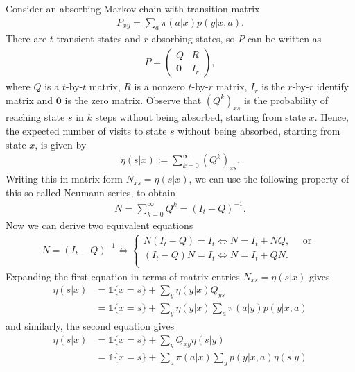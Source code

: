 \documentclass[a4paper]{article}
\begin{document}
Consider an absorbing Markov chain with transition matrix
\begin{align*}
  P_{xy} = \sum_{a} \pi(a | x) p(y | x, a) .
\end{align*}
There are $t$ transient states and $r$ absorbing states, so $P$ can be written
as
\begin{align*}
  P = \begin{pmatrix}
        Q & R \\
        \mathbf{0} & I_{r}
      \end{pmatrix} ,
\end{align*}
where $Q$ is a $t$-by-$t$ matrix, $R$ is a nonzero $t$-by-$r$ matrix, $I_{r}$ is
the $r$-by-$r$ identify matrix and $\mathbf{0}$ is the zero matrix.
%
Observe that $(Q^{k})_{xs}$ is the probability of reaching state $s$ in $k$
steps without being absorbed, starting from state $x$. Hence, the expected
number of visits to state $s$ without being absorbed, starting from state $x$,
is given by
\begin{align*}
  \eta(s | x) := \sum_{k=0}^{\infty} (Q^{k})_{xs} .
\end{align*}
%
Writing this in matrix form $N_{xs} = \eta(s | x)$, we can use the following
property of this so-called Neumann series, to obtain
\begin{align*}
  N = \sum_{k=0}^{\infty} Q^{k} = {(I_{t} - Q)}^{-1} .
\end{align*}
Now we can derive two equivalent equations
\begin{align*}
  N = (I_{t} - Q)^{-1} \iff
  \begin{cases}
    N (I_{t} - Q) = I_{t} \iff N = I_{t} + NQ ,
    \quad  \text{ or }  \\
    (I_{t} - Q) N = I_{t} \iff N = I_{t} + QN . \\
  \end{cases}
\end{align*}
%
Expanding the first equation in terms of matrix entries $N_{xs} = \eta(s | x)$
gives
\begin{align*}
  \eta(s | x) &= \mathds{1}\{ x = s \} + \sum_{y}  \eta(y | x) Q_{ys} \\
  &= \mathds{1}\{ x = s \} +  \sum_{y}\eta(y | x) \sum_{a} \pi(a | y) p(y | x, a)
\end{align*}
and similarly, the second equation gives
\begin{align*}
  \eta(s | x) &= \mathds{1}\{ x = s \} + \sum_{y} Q_{xy} \eta(s | y) \\
  &= \mathds{1}\{ x = s \} +  \sum_{a} \pi(a | x) \sum_{y} p(y | x, a) \eta(s | y)
\end{align*}
\end{document}

